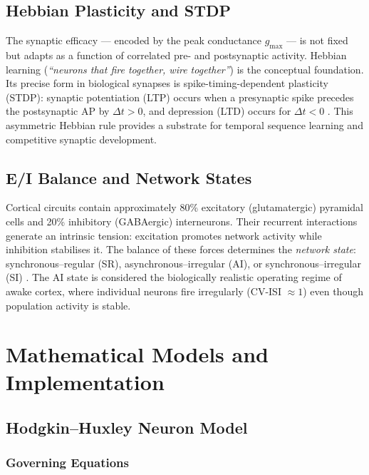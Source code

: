 \documentclass[11pt, a4paper, twocolumn]{article}
\begin{document}
\subsection{Hebbian Plasticity and STDP}

The synaptic efficacy --- encoded by the peak conductance $g_{\max}$ --- is
not fixed but adapts as a function of correlated pre- and postsynaptic
activity. Hebbian learning (\textit{``neurons that fire together, wire
together''}) is the conceptual foundation. Its precise form in biological
synapses is spike-timing-dependent plasticity (STDP): synaptic potentiation
(LTP) occurs when a presynaptic spike precedes the postsynaptic AP by
$\Delta t > 0$, and depression (LTD) occurs for $\Delta t < 0$
\citep{Bi1998}. This asymmetric Hebbian rule provides a substrate for
temporal sequence learning and competitive synaptic development.

\subsection{E/I Balance and Network States}

Cortical circuits contain approximately 80\% excitatory (glutamatergic)
pyramidal cells and 20\% inhibitory (GABAergic) interneurons. Their
recurrent interactions generate an intrinsic tension: excitation promotes
network activity while inhibition stabilises it. The balance of these forces
determines the \emph{network state}: synchronous--regular (SR), asynchronous--irregular
(AI), or synchronous--irregular (SI) \citep{Brunel2000}. The AI state is
considered the biologically realistic operating regime of awake cortex, where
individual neurons fire irregularly (CV-ISI $\approx 1$) even though
population activity is stable.

\section{Mathematical Models and Implementation}
\label{sec:methods}

\subsection{Hodgkin--Huxley Neuron Model}
\label{sec:hh}

\subsubsection{Governing Equations}
\end{document}
